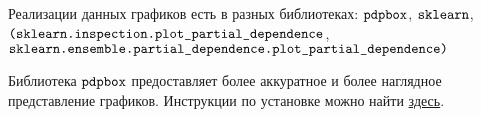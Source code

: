 Реализации данных графиков есть в разных библиотеках: $\verb|pdpbox|$, $\verb|sklearn|$,\\ $\verb|(sklearn.inspection.plot_partial_dependence|$,\\ $\verb|sklearn.ensemble.partial_dependence.plot_partial_dependence)|$

Библиотека $\verb|pdpbox|$ предоставляет более аккуратное и более наглядное представление графиков. Инструкции по установке можно найти \href{https://github.com/SauceCat/PDPbox}{здесь}.